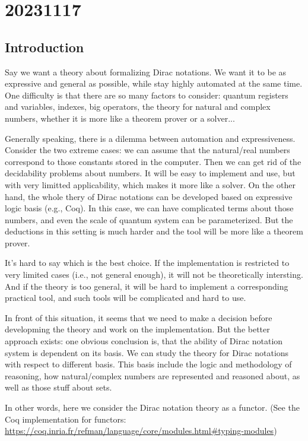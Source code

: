 
\chapter{20231117}

\section{Introduction}

Say we want a theory about formalizing Dirac notations. We want it to be as expressive and general as possible, while stay highly automated at the same time. One difficulty is that there are so many factors to consider: quantum registers and variables, indexes, big operators, the theory for natural and complex numbers, whether it is more like a theorem prover or a solver... 

Generally speaking, there is a dilemma between automation and expressiveness. Consider the two extreme cases: we can assume that the natural/real numbers correspond to those constants stored in the computer. Then we can get rid of the decidability problems about numbers. It will be easy to implement and use, but with very limitted applicability, which makes it more like a solver. On the other hand, the whole thery of Dirac notations can be developed based on expressive logic basis (e.g., Coq). In this case, we can have complicated terms about those numbers, and even the scale of quantum system can be parameterized. But the deductions in this setting is much harder and the tool will be more like a theorem prover.

It's hard to say which is the best choice. If the implementation is restricted to very limited cases (i.e., not general enough), it will not be theoretically intersting. And if the theory is too general, it will be hard to implement a corresponding practical tool, and such tools will be complicated and hard to use.

In front of this situation, it seems that we need to make a decision before developming the theory and work on the implementation. But the better approach exists: one obvious conclusion is, that the ability of Dirac notation system is dependent on its basis. We can study the theory for Dirac notations with respect to different basis.
This basis include the logic and methodology of reasoning, how natural/complex numbers are represented and reasoned about, as well as those stuff about sets. 

In other words, here we consider the Dirac notation theory as a functor. (See the Coq implementation for functors: \url{https://coq.inria.fr/refman/language/core/modules.html\#typing-modules})

